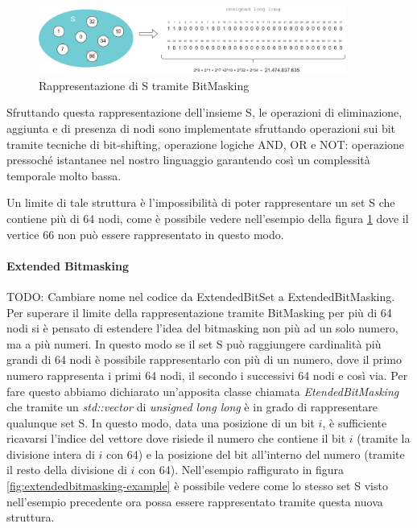 \begin{figure}[h]
	\centering
	\includegraphics[width=0.9\textwidth]{./images/BitMasking Example.png}
	\caption{Rappresentazione di S tramite BitMasking}
	\label{fig:bitmasking-example}
\end{figure}

Sfruttando questa rappresentazione dell'insieme S, le operazioni di eliminazione, aggiunta e di presenza di nodi sono implementate sfruttando operazioni sui bit tramite tecniche di bit-shifting, operazione logiche AND, OR e NOT: operazione pressoché istantanee nel nostro linguaggio garantendo così un complessità temporale molto bassa.

Un limite di tale struttura è l'impossibilità di poter rappresentare un set S che contiene più di 64 nodi, come è possibile vedere nell'esempio della figura \ref{fig:bitmasking-example} dove il vertice 66 non può essere rappresentato in questo modo.

\paragraph{Extended Bitmasking}
TODO: Cambiare nome nel codice da ExtendedBitSet a ExtendedBitMasking.
Per superare il limite della rappresentazione tramite BitMasking per più di 64 nodi si è pensato di estendere l'idea del bitmasking non più ad un solo numero, ma a più numeri. In questo modo se il set S può raggiungere cardinalità più grandi di 64 nodi è possibile rappresentarlo con più di un numero, dove il primo numero rappresenta i primi 64 nodi, il secondo i successivi 64 nodi e così via. Per fare questo abbiamo dichiarato un'apposita classe chiamata \textit{EtendedBitMasking} che tramite un \textit{std::vector} di \textit{unsigned long long} è in grado di rappresentare qualunque set S. In questo modo, data una posizione di un bit $i$, è sufficiente ricavarsi l'indice del vettore dove risiede il numero che contiene il bit $i$ (tramite la divisione intera di $i$ con 64) e la posizione del bit all'interno del numero (tramite il resto della divisione di $i$ con 64). Nell'esempio raffigurato in figura \ref{fig:extendedbitmasking-example} è possibile vedere come lo stesso set S visto nell'esempio precedente ora possa essere rappresentato tramite questa nuova struttura.

